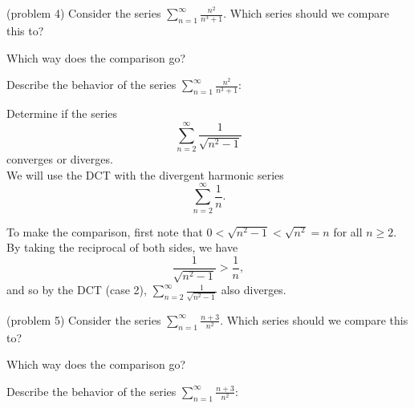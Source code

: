 \documentclass[handout]{ximera}
\begin{document}
\begin{problem}(problem 4)
Consider the series $\displaystyle{\sum_{n=1}^\infty \frac{n^2}{n^3 + 1}}$.
Which series should we compare this to?

\begin{multipleChoice}
\end{multipleChoice}

Which way does the comparison go?
\begin{multipleChoice}
\end{multipleChoice}

Describe the behavior of the series $\sum_{n=1}^\infty \frac{n^2}{n^3 + 1}:$
\begin{multipleChoice}
\end{multipleChoice}

\end{problem}



\begin{example}[example 5]
Determine if the series 
\[
\sum_{n=2}^\infty \frac{1}{\sqrt{n^2 -1}}
\]
 converges or diverges.\\
We will use the DCT with the divergent harmonic series 
\[
\sum_{n=2}^\infty \frac{1}{n}.
\]

To make the comparison, first note that $0 < \sqrt{n^2 -1} < \sqrt{n^2} = n$ for all $n \geq 2$. By taking the reciprocal of both sides,
we have 
\[
\frac{1}{\sqrt{n^2 -1}} > \frac{1}{n},
\]
and so by the DCT (case 2), $\sum_{n=2}^\infty \frac{1}{\sqrt{n^2 -1}}$ also diverges.
\end{example}


\begin{problem}(problem 5)
Consider the series $\displaystyle{\sum_{n=1}^\infty \frac{n+3}{n^2}}$.
Which series should we compare this to?

\begin{multipleChoice}
\end{multipleChoice}

Which way does the comparison go?
\begin{multipleChoice}
\end{multipleChoice}

Describe the behavior of the series $\sum_{n=1}^\infty \frac{n+3}{n^2}:$
\begin{multipleChoice}
\end{multipleChoice}

\end{problem}
\end{document}
